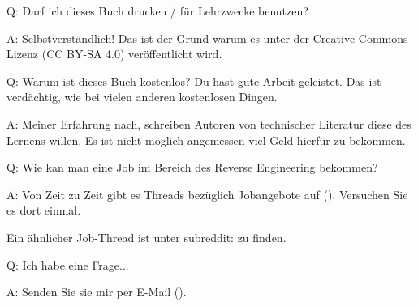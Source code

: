\par Q: Darf ich dieses Buch drucken / für Lehrzwecke benutzen?
\par A: Selbstverständlich! Das ist der Grund warum es unter der Creative Commons Lizenz (CC BY-SA 4.0) veröffentlicht wird.

\par Q: Warum ist dieses Buch kostenlos? Du hast gute Arbeit geleistet. Das ist verdächtig, wie bei vielen anderen kostenlosen Dingen.
\par A: Meiner Erfahrung nach, schreiben Autoren von technischer Literatur diese des Lernens willen. Es ist nicht möglich angemessen
viel Geld hierfür zu bekommen.

\par Q: Wie kan man eine Job im Bereich des Reverse Engineering bekommen?
\par A: Von Zeit zu Zeit gibt es Threads bezüglich Jobangebote auf \FNURLREDDIT{}
(\RedditHiringThread{}).
Versuchen Sie es dort einmal.

Ein ähnlicher Job-Thread ist unter subreddit: \NetsecHiringThread{} zu finden.

\par Q: Ich habe eine Frage...
\par A: Senden Sie sie mir per E-Mail (\EMAIL).
